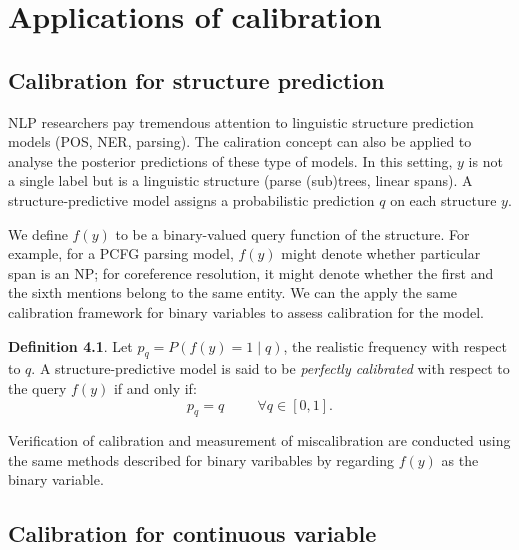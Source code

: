 \section{Applications of calibration}

\subsection{Calibration for structure prediction}

NLP researchers pay tremendous attention to linguistic structure prediction models (POS, NER, parsing). The caliration concept can also be applied to analyse the posterior predictions of these type of models. In this setting, $y$ is not a single label but is a linguistic structure (parse (sub)trees, linear spans). A structure-predictive model assigns a probabilistic prediction $q$ on each structure $y$. 

We define $f(y)$ to be a binary-valued query function of the structure. For example, for a PCFG parsing model, $f(y)$ might denote whether particular span is an NP; for coreference resolution, it might denote whether the first and the sixth mentions belong to the same entity. We can the apply the same calibration framework for binary variables to assess calibration for the model. 

\textbf{Definition 4.1}. Let $p_q = P(f(y) = 1 \mid q)$, the realistic frequency with respect to $q$. A structure-predictive model is said to be \textit{perfectly calibrated} with respect to the query $f(y)$ if and only if:
$$p_q = q \hspace{1cm} \forall q \in [0, 1].$$  

Verification of calibration and measurement of miscalibration are conducted using the same methods described for binary varibables by regarding $f(y)$ as the binary variable. 

\subsection{Calibration for continuous variable}


